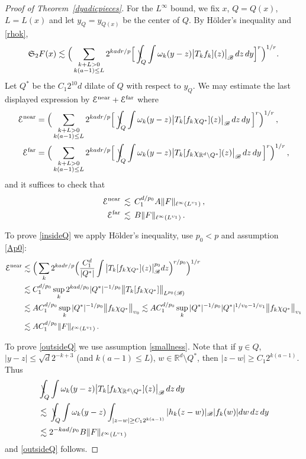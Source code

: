 \documentclass[11pt]{amsart}
\theoremstyle{definition}
\numberwithin{theorem}{section}
\numberwithin{definition}{section}
\renewcommand{\wp}{\upsilon}
\def\Enear{{\mathcal E^{\text{\rm near}}} }
\def\Efar{{\mathcal E^{\text{\rm far}}} }
\def\intslash{\rlap{\kern  .32em $\mspace {.5mu}\backslash$ }\int}
\newcommand{\note}[1]{\footnote{\texttt{\Small #1}}}
\def\intslash{\rlap{\kern  .32em $\mspace {.5mu}\backslash$ }\int}
\def\sB{{\mathscr{B}}}
\def\lc{\lesssim}
\def\om{\omega}              \def\Om{\Omega}
\def\fS{{\mathfrak {S}}}
\def\bbR{{\mathbb {R}}}
\begin{document}
\begin{proof}[Proof of Theorem~\ref{dyadicpieces}]
For the $L^\infty$ bound,   we fix $x$, $Q=Q(x)$, $L=L(x)$ and
let $y_Q=y_{Q(x)}$ be the center of $Q$.
By H\"older's inequality and \eqref{rhok},
$$
\fS_2 F(x)\lc \Big(
\sum_{\substack{k+L>0\\k(a-1)\le L}}
2^{kad r/p} \Big[\intslash_{Q}\int \om_k(y-z)
\big|T_kf_k](z)\big|_{\sB} \, dz\, dy \Big]^r \Big)^{1/r}.
$$
Let $Q^*$ be the  $C_1 2^{10}d$ dilate of $Q$ with respect to $y_Q$.
We may estimate the last displayed expression by
$\Enear+\Efar$ where
\begin{align*}
\Enear &=\Big(
\sum_{\substack{k+L>0\\k(a-1)\le L}}
2^{kad r/p} \Big[\intslash_{Q}\int\om_k(y-z)
\big|T_k[f_k\chi_{Q^{*}}](z)\big|_{\sB} \,dz\,dy \, \Big]^r \Big)^{1/r}\, ,
\\
\Efar&
=\Big(\sum_{\substack{k+L>0\\k(a-1)\le L}}
2^{kad r/p} \Big[\intslash_{Q}\int\om_k(y-z)
\big|T_k[f_k\chi_{\bbR^d\setminus Q^{*}}](z)\big|_{\sB} \, dz\, dy
\, \Big]^r \Big)^{1/r}\, ,
\end{align*}
and it suffices to check that
\begin{align}
\label{insideQ}
\Enear \, &\lc \,   C_1^{d/p_0}
 A
\|F\|_{\ell^\infty(L^{\wp_1})}\, ,
\\
\label{outsideQ}
\Efar \, &\lc \,
B \|F\|_{\ell^\infty(L^{\wp_1})}\, .
\end{align}





To prove \eqref{insideQ}
 we apply H\"older's inequality, use $p_0<p$ and assumption \eqref{Ap0}:
\begin{align*}
\Enear &\lc  \Big(\sum_k 2^{kad r/p}   \Big( \frac{C_1^d}{|Q^*|}\int
\big|T_{k} [f_{k}\chi_{Q^*}](z)\big|_\sB^{p_0}
dz\Big)^{r/p_0} \Big)^{1/r}
\\
&\lc C_1^{d/p_0} \sup_k 2^{kad/p_0} |Q^*|^{-1/p_0}
\big\|{T}_{k} [f_{k}\chi_{Q^*}]\big\|_{L^{p_0}(\sB)}
\\
&\lc AC_1^{d/p_0}
\sup_k |Q^*|^{-1/p_0}
\big\|f_{k}\chi_{Q^*}\big\|_{\wp_0}
\lc AC_1^{d/p_0}
\sup_k |Q^*|^{-1/p_0} |Q^*|^{1/\wp_0-1/\wp_1}
\big\|f_{k}\chi_{Q^*}\big\|_{\wp_1}
\\&
\lc AC_1^{d/p_0} \|F\|_{\ell^\infty(L^{\wp_1})}\,.
\end{align*}


To prove   \eqref{outsideQ} we use  assumption \eqref{smallness}.
Note that if $y\in Q$, $|y-z|\le \sqrt{d}2^{-k+3}$
(and $k(a-1)\le L$),
 $w\in  \bbR^d\setminus Q^*$, then $|z-w|\ge  C_1 2^{k(a -1)}$.
Thus
\begin{align*}&\intslash_{Q} \int \om_k(y-z)
\big|T_k[f_k\chi_{\bbR^d\setminus Q^{*}}](z)\big|_{\sB} \, dz\, dy
\\&\lc
\intslash_{Q}\int \om_k(y-z)
\int_{|z-w|\ge C_1 2^{k (a-1)}} |h_k(z-w)|_\sB |f_k(w)| dw
\, dz\, dy
\\
&\lc 2^{-kad /p_0} B\|F\|_{\ell^\infty(L^{\wp_1})}
\end{align*}
and
\eqref{outsideQ} follows.


\end{proof}
\end{document}
